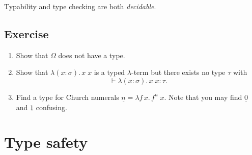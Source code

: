 \begin{theorem}
  Typability and type checking are both \emph{decidable}.
\end{theorem}

\subsection*{Exercise}
\begin{enumerate}
  \item Show that $\Omega$ does not have a type.
  \item Show that $\lambda (x : \sigma).\, x\; x$ is a typed $\lambda$-term but
    there exists no type $\tau$ with 
    \[
      \vdash \lambda (x : \sigma).\, x\; x : \tau.
    \]
  \item Find a type for Church numerals $\underline{n} =
    \lambda f\,x.\, f^n\;x$. Note that you may find $\underline{0}$ and
    $\underline{1}$ confusing.
  \end{enumerate}
\section{Type safety}
